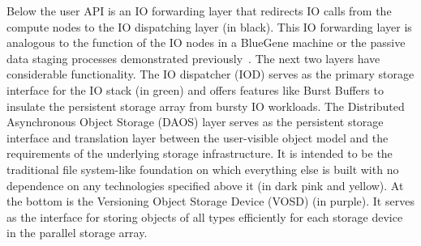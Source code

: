 \documentclass{sig-alt-gov2}
\begin{document}
Below the user API is an IO forwarding layer that redirects IO calls from the
compute nodes to the IO dispatching layer (in black).  This IO forwarding layer
is analogous to the function of the IO nodes in a BlueGene machine or the
passive data staging processes demonstrated
previously~\cite{nisar:2008:staging,Abbasi:2009:datatap}. The next two layers
have considerable functionality. The IO dispatcher (IOD) serves as the primary
storage interface for the IO stack (in green) and offers features like Burst
Buffers to insulate the persistent storage array from bursty IO workloads.
The Distributed Asynchronous Object Storage (DAOS)
layer serves as the persistent storage interface and translation layer between
the user-visible object model and the requirements of the underlying storage
infrastructure. It is intended to be the traditional file system-like
foundation on which everything else is built with no dependence on any
technologies specified above it (in dark pink and yellow).
At the bottom is the Versioning Object
Storage Device (VOSD) (in purple).  It serves as the interface for storing
objects of all types efficiently for each storage device in the parallel
storage array.

\end{document}
